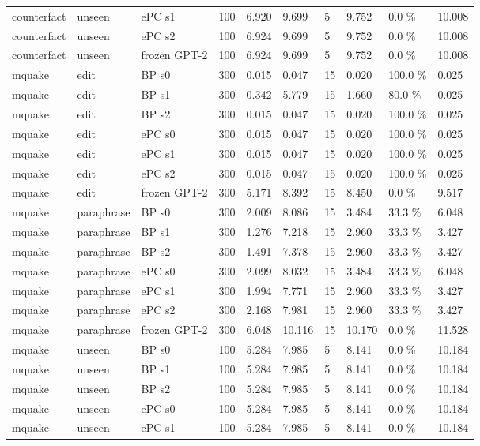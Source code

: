 \documentclass[10pt,a4paper]{article}
\begin{document}
\begin{center}
\begin{tabularx}{\textwidth}{@{}p{}XXXXXXXXX@{}}
counterfact & unseen & ePC s1 & 100 & 6.920 & 9.699 & 5 & 9.752 & 0.0 \% & 10.008 \\
counterfact & unseen & ePC s2 & 100 & 6.924 & 9.699 & 5 & 9.752 & 0.0 \% & 10.008 \\
counterfact & unseen & frozen GPT-2 & 100 & 6.924 & 9.699 & 5 & 9.752 & 0.0 \% & 10.008 \\
mquake & edit & BP s0 & 300 & 0.015 & 0.047 & 15 & 0.020 & 100.0 \% & 0.025 \\
mquake & edit & BP s1 & 300 & 0.342 & 5.779 & 15 & 1.660 & 80.0 \% & 0.025 \\
mquake & edit & BP s2 & 300 & 0.015 & 0.047 & 15 & 0.020 & 100.0 \% & 0.025 \\
mquake & edit & ePC s0 & 300 & 0.015 & 0.047 & 15 & 0.020 & 100.0 \% & 0.025 \\
mquake & edit & ePC s1 & 300 & 0.015 & 0.047 & 15 & 0.020 & 100.0 \% & 0.025 \\
mquake & edit & ePC s2 & 300 & 0.015 & 0.047 & 15 & 0.020 & 100.0 \% & 0.025 \\
mquake & edit & frozen GPT-2 & 300 & 5.171 & 8.392 & 15 & 8.450 & 0.0 \% & 9.517 \\
mquake & paraphrase & BP s0 & 300 & 2.009 & 8.086 & 15 & 3.484 & 33.3 \% & 6.048 \\
mquake & paraphrase & BP s1 & 300 & 1.276 & 7.218 & 15 & 2.960 & 33.3 \% & 3.427 \\
mquake & paraphrase & BP s2 & 300 & 1.491 & 7.378 & 15 & 2.960 & 33.3 \% & 3.427 \\
mquake & paraphrase & ePC s0 & 300 & 2.099 & 8.032 & 15 & 3.484 & 33.3 \% & 6.048 \\
mquake & paraphrase & ePC s1 & 300 & 1.994 & 7.771 & 15 & 2.960 & 33.3 \% & 3.427 \\
mquake & paraphrase & ePC s2 & 300 & 2.168 & 7.981 & 15 & 2.960 & 33.3 \% & 3.427 \\
mquake & paraphrase & frozen GPT-2 & 300 & 6.048 & 10.116 & 15 & 10.170 & 0.0 \% & 11.528 \\
mquake & unseen & BP s0 & 100 & 5.284 & 7.985 & 5 & 8.141 & 0.0 \% & 10.184 \\
mquake & unseen & BP s1 & 100 & 5.284 & 7.985 & 5 & 8.141 & 0.0 \% & 10.184 \\
mquake & unseen & BP s2 & 100 & 5.284 & 7.985 & 5 & 8.141 & 0.0 \% & 10.184 \\
mquake & unseen & ePC s0 & 100 & 5.284 & 7.985 & 5 & 8.141 & 0.0 \% & 10.184 \\
mquake & unseen & ePC s1 & 100 & 5.284 & 7.985 & 5 & 8.141 & 0.0 \% & 10.184 \\

\end{tabularx}
\end{center}
\end{document}
